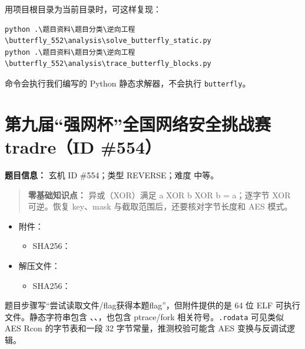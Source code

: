 用项目根目录为当前目录时，可这样复现：

\begin{verbatim}
python .\题目资料\题目分类\逆向工程\butterfly_552\analysis\solve_butterfly_static.py
python .\题目资料\题目分类\逆向工程\butterfly_552\analysis\trace_butterfly_blocks.py
\end{verbatim}

命令会执行我们编写的 Python 静态求解器，不会执行 \texttt{butterfly}。

\section{第九届``强网杯''全国网络安全挑战赛 tradre（ID \#554）}\label{ux7b2cux4e5dux5c4aux5f3aux7f51ux676fux5168ux56fdux7f51ux7edcux5b89ux5168ux6311ux6218ux8d5b-tradreid-554}

\textbf{题目信息：} 玄机 ID \#554；类型 REVERSE；难度 中等。

\begin{quote}
\textbf{零基础知识点：} 异或（XOR）满足 a XOR b XOR b = a；逐字节 XOR 可逆。恢复 key、mask 与截取范围后，还要核对字节长度和 AES 模式。
\end{quote}

\begin{itemize}
\tightlist
\item
  附件：\texttt{}

  \begin{itemize}
  \tightlist
  \item
    SHA256：
  \end{itemize}
\item
  解压文件：\texttt{}

  \begin{itemize}
  \tightlist
  \item
    SHA256：
  \end{itemize}
\end{itemize}

题目步骤写``尝试读取文件/flag获得本题flag''，但附件提供的是 64 位 ELF 可执行文件。静态字符串包含 \texttt{}、\texttt{}、\texttt{}，也包含 ptrace/fork 相关符号。\texttt{.rodata} 可见类似 AES Rcon 的字节表和一段 32 字节常量，推测校验可能含 AES 变换与反调试逻辑。

